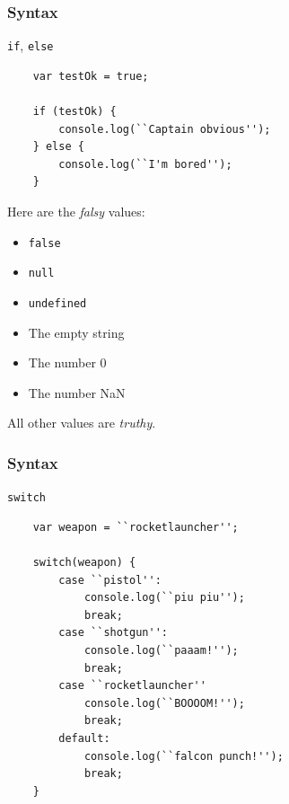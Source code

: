 \begin{frame}[fragile]
  \frametitle{Syntax}

  \begin{block}{\texttt{if}, \texttt{else}}
    \scriptsize{
    \begin{verbatim}
    var testOk = true;

    if (testOk) {
        console.log(``Captain obvious'');
    } else {
        console.log(``I'm bored'');
    }
    \end{verbatim}
    }
    Here are the \textit{falsy} values:
    \begin{itemize}
      \item \texttt{false}
      \item \texttt{null}
      \item \texttt{undefined}
      \item The empty string
      \item The number 0
      \item The number NaN
    \end{itemize}
    All other values are \textit{truthy}.
  \end{block}
\end{frame}

\begin{frame}[fragile]
  \frametitle{Syntax}

  \begin{block}{\texttt{switch}}
    \scriptsize{
    \begin{verbatim}
    var weapon = ``rocketlauncher'';

    switch(weapon) {
        case ``pistol'':
            console.log(``piu piu'');
            break;
        case ``shotgun'':
            console.log(``paaam!'');
            break;
        case ``rocketlauncher''
            console.log(``BOOOOM!'');
            break;
        default:
            console.log(``falcon punch!'');
            break;
    }
    \end{verbatim}
    }
  \end{block}
\end{frame}

